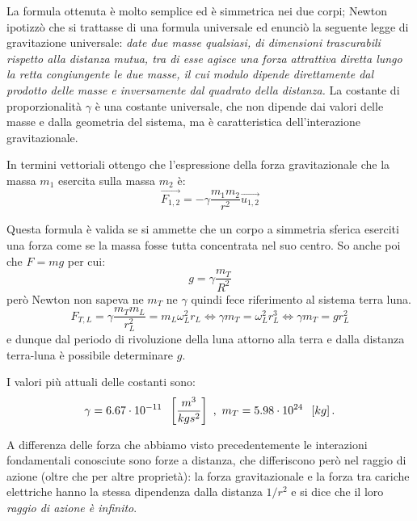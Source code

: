 \documentclass[class=book, crop=false, oneside, 12pt]{standalone}
\begin{document}
La formula ottenuta è molto semplice ed è simmetrica nei due corpi; 
Newton ipotizzò che si trattasse di una formula universale ed enunciò la seguente legge di gravitazione universale: \newline
\emph{date due masse qualsiasi, di dimensioni trascurabili rispetto alla distanza mutua, tra di esse agisce una forza attrattiva diretta lungo la retta congiungente le due masse, il cui modulo dipende direttamente dal prodotto delle masse e inversamente dal quadrato della distanza.}\newline
La costante di proporzionalità \(\gamma\) è una costante universale, che non dipende dai valori delle masse e dalla geometria del sistema, ma è caratteristica dell'interazione gravitazionale.

In termini vettoriali ottengo che l'espressione della forza gravitazionale che la massa \(m_1\) esercita sulla massa \(m_2\) è:
\begin{equation}
    \overrightarrow{F_{1,2}} = - \gamma \frac{m_1 m_2}{r^2} \overrightarrow{u_{1,2}}
\end{equation}

Questa formula è valida se si ammette che un corpo a simmetria sferica eserciti una forza come se la massa fosse tutta concentrata nel suo centro.
So anche poi che \(F = mg\) per cui:
\begin{equation}
    g = \gamma \frac{m_T}{R^2}
\end{equation}
però Newton non sapeva ne \(m_T\) ne \(\gamma\) quindi fece riferimento al sistema terra luna.
\begin{equation}
    F_{T,L} = \gamma \frac{m_T m_L}{r_L^2} = m_L \omega_L^2 r_L \Leftrightarrow \gamma m_T = \omega_L^2 r_L^3 \Leftrightarrow \gamma m_T = g r_L^2
\end{equation}
e dunque dal periodo di rivoluzione della luna attorno alla terra e dalla distanza terra-luna è possibile determinare \(g\).

I valori più attuali delle costanti sono:
\begin{equation*}
    \gamma = 6.67 \cdot 10^{-11} \hspace{0.2cm} \left[\frac{m^3}{kg s^2}\right] \ , \ m_T = 5.98 \cdot 10^{24} \hspace{0.2cm} \left[kg\right] .
\end{equation*}

A differenza delle forza che abbiamo visto precedentemente le interazioni fondamentali conosciute sono forze a distanza, che differiscono però nel raggio di azione (oltre che per altre proprietà): 
la forza gravitazionale e la forza tra cariche elettriche hanno la stessa dipendenza dalla distanza \(1 / r^2\) e si dice che il loro \emph{raggio di azione è infinito}.
\end{document}
